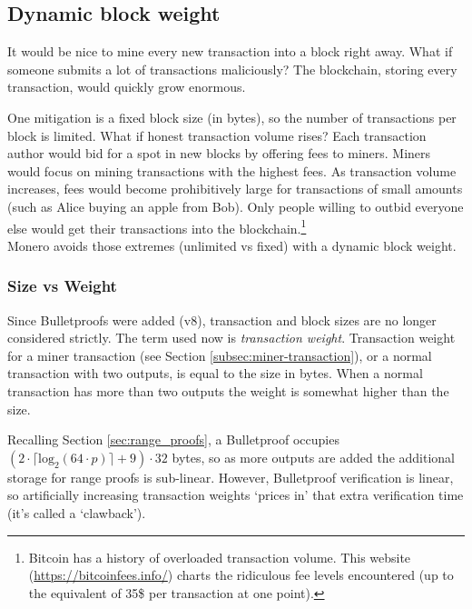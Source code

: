 \subsection{Dynamic block weight}
\label{subsec:dynamic-block-weight}

It would be nice to mine every new transaction into a block right away. What if someone submits a lot of transactions maliciously? The blockchain, storing every transaction, would quickly grow enormous.

One mitigation is a fixed block size (in bytes), so the number of transactions per block is limited. What if honest transaction volume rises? Each transaction author would bid for a spot in new blocks by offering fees to miners. Miners would focus on mining transactions with the highest fees. As transaction volume increases, fees would become prohibitively large for transactions of small amounts (such as Alice buying an apple from Bob). Only people willing to outbid everyone else would get their transactions into the blockchain.\footnote{Bitcoin has a history of overloaded transaction volume. This website (\url{https://bitcoinfees.info/}) charts the ridiculous fee levels encountered (up to the equivalent of 35\$ per transaction at one point).}\\

Monero avoids those extremes (unlimited vs fixed) with a dynamic block weight.

\subsubsection*{Size vs Weight}

Since Bulletproofs were added (v8), transaction and block sizes are no longer considered strictly. The term used now is {\em transaction weight}. Transaction weight for a miner transaction (see Section \ref{subsec:miner-transaction}), or a normal transaction with two outputs, is equal to the size in bytes. When a normal transaction has more than two outputs the weight is somewhat higher than the size.

Recalling Section \ref{sec:range_proofs}, a Bulletproof occupies $(2 \cdot \lceil \textrm{log}_2(64 \cdot p) \rceil + 9) \cdot 32$ bytes, so as more outputs are added the additional storage for range proofs is sub-linear. However, Bulletproof verification is linear, so artificially increasing transaction weights `prices in' that extra verification time (it's called a `clawback').%

